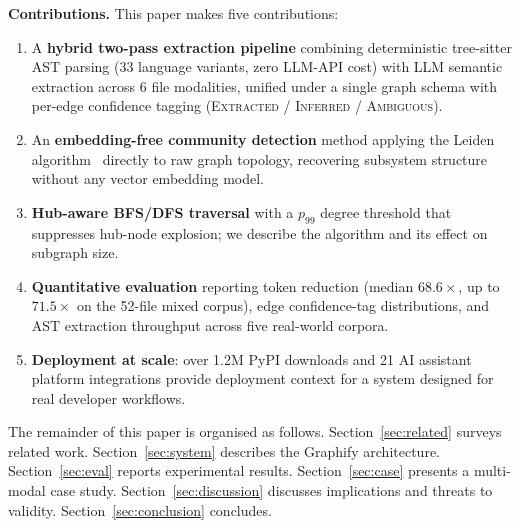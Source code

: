 \smallskip
\noindent\textbf{Contributions.} This paper makes five contributions:
\begin{enumerate}
  \item A \textbf{hybrid two-pass extraction pipeline} combining deterministic
        tree-sitter AST parsing (33 language variants, zero LLM-API cost) with
        LLM semantic extraction across 6 file modalities, unified under a
        single graph schema with per-edge confidence tagging
        (\textsc{Extracted} / \textsc{Inferred} / \textsc{Ambiguous}).
  \item An \textbf{embedding-free community detection} method applying the
        Leiden algorithm~\cite{leiden} directly to raw graph topology, recovering
        subsystem structure without any vector embedding model.
  \item \textbf{Hub-aware BFS/DFS traversal} with a $p_{99}$ degree threshold
        that suppresses hub-node explosion; we describe the algorithm and its
        effect on subgraph size.
  \item \textbf{Quantitative evaluation} reporting token reduction (median
        $68.6\times$, up to $71.5\times$ on the 52-file mixed corpus),
        edge confidence-tag distributions, and AST extraction throughput
        across five real-world corpora.
  \item \textbf{Deployment at scale}: over 1.2M PyPI downloads and 21 AI
        assistant platform integrations provide deployment context
        for a system designed for real developer workflows.
\end{enumerate}

The remainder of this paper is organised as follows.
Section~\ref{sec:related} surveys related work.
Section~\ref{sec:system} describes the Graphify architecture.
Section~\ref{sec:eval} reports experimental results.
Section~\ref{sec:case} presents a multi-modal case study.
Section~\ref{sec:discussion} discusses implications and threats to validity.
Section~\ref{sec:conclusion} concludes.

